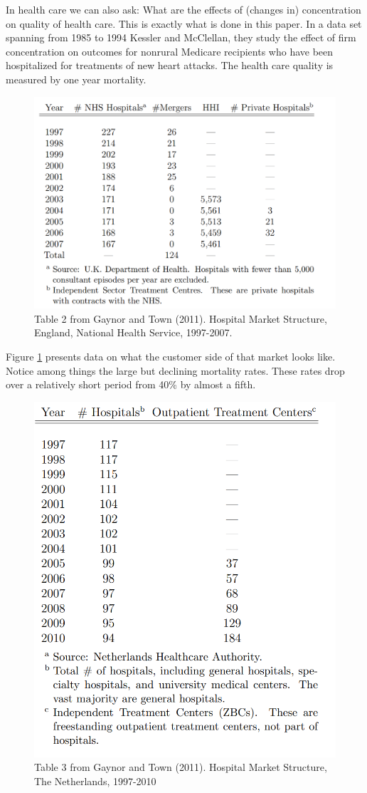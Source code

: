 \documentclass[
]{book}
\begin{document}
In health care we can also ask: What are the effects of (changes in) concentration on quality of health care. This is exactly what is done in this paper. In a data set spanning from 1985 to 1994 Kessler and McClellan, they study the effect of firm concentration on outcomes for nonrural Medicare recipients who have been hospitalized for treatments of new heart attacks. The
health care quality is measured by one year mortality.

\begin{figure}

{\centering \includegraphics[width=0.7\linewidth]{img/oligopoly/papertable4} 

}

\caption{Table 2 from Gaynor and Town (2011). Hospital Market Structure, England, National Health Service, 1997-2007.}\label{fig:oligopolypapertable4}
\end{figure}

Figure \ref{fig:oligopolypapertable4} presents data on what the customer side of that market looks like. Notice among things the large but declining mortality rates. These rates drop over a relatively short period from 40\% by almost a fifth.

\begin{figure}

{\centering \includegraphics[width=0.7\linewidth]{img/oligopoly/papertable5} 

}

\caption{Table 3 from Gaynor and Town (2011). Hospital Market Structure, The Netherlands, 1997-2010}\label{fig:oligopolypapertable5}
\end{figure}
\end{document}
